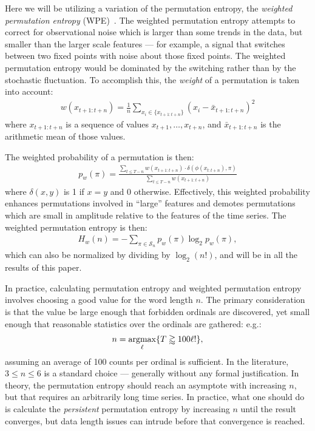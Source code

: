 Here we will be utilizing a variation of the permutation entropy, the
\emph{weighted permutation entropy} (WPE)~\cite{fadlallah2013}. The weighted
permutation entropy attempts to correct for observational noise which is larger
than some trends in the data, but smaller than the larger scale features --- for
example, a signal that switches between two fixed points with noise about those
fixed points. The weighted permutation entropy would be dominated by the
switching rather than by the stochastic fluctuation. To accomplish this, the
\emph{weight} of a permutation is taken into account:
\begin{align*}
  w(x_{t+1:t+n}) = \frac{1}{n}
                 \sum_{x_i \in \{x_{t+1:t+n}\}}
                 \left( x_i - \bar{x}_{t+1:t+n} \right)^2
\end{align*}
where $x_{t+1:t+n}$ is a sequence of values $x_{t+1}, \ldots, x_{t+n}$, and
$\bar{x}_{t+1:t+n}$ is the arithmetic mean of those values.

The weighted probability of a permutation is then:
\begin{align*}
  p_w(\pi) = \frac{\displaystyle \sum_{t \le T - n} w(x_{t+1:t+n}) \cdot \delta(\phi(x_{t:t+n}), \pi) }{\displaystyle \sum_{t \le T - n} w(x_{t+1:t+n})}
\end{align*}
where $\delta(x, y)$ is 1 if $x = y$ and 0 otherwise. Effectively, this weighted
probability enhances permutations involved in ``large'' features and demotes
permutations which are small in amplitude relative to the features of the time
series. The weighted permutation entropy is then:
\begin{align*}
  H_w(n) = - \sum_{\pi \in \mathcal{S}_n} p_w(\pi) \log_2 p_w(\pi),
\end{align*}
which can also be normalized by dividing by $\log_2(n!)$, and will be in all the
results of this paper.

In practice, calculating permutation entropy and weighted permutation entropy
involves choosing a good value for the word length $n$. The primary
consideration is that the value be large enough that forbidden ordinals are
discovered, yet small enough that reasonable statistics over the ordinals are
gathered: e.g.:
\begin{align*}
  n = \operatornamewithlimits{argmax}_\ell \{ T \gtrapprox 100 \ell! \},
\end{align*}
assuming an average of 100 counts per ordinal is sufficient. In the literature,
$3 \le n \le 6$ is a standard choice --- generally without any formal
justification. In theory, the permutation entropy should reach an asymptote with
increasing $n$, but that requires an arbitrarily long time series. In practice,
what one should do is calculate the \emph{persistent} permutation entropy by
increasing $n$ until the result converges, but data length issues can intrude
before that convergence is reached.

